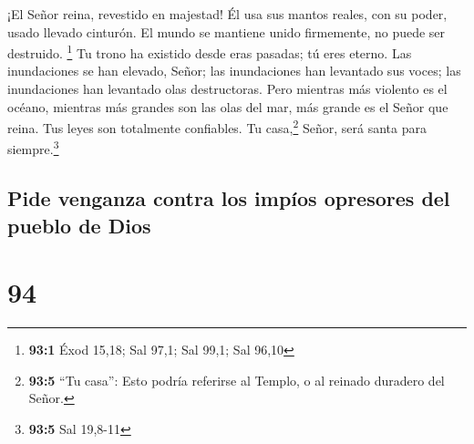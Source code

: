  ¡El Señor reina, revestido en majestad! Él usa sus mantos
reales, con su poder, usado llevado cinturón. El mundo se mantiene unido
firmemente, no puede ser destruido. \footnote{\textbf{93:1} Éxod 15,18;
  Sal 97,1; Sal 99,1; Sal 96,10}  Tu trono ha existido
desde eras pasadas; tú eres eterno.  Las inundaciones se
han elevado, Señor; las inundaciones han levantado sus voces; las
inundaciones han levantado olas destructoras.  Pero
mientras más violento es el océano, mientras más grandes son las olas
del mar, más grande es el Señor que reina.  Tus leyes son
totalmente confiables. Tu casa,\footnote{\textbf{93:5} ``Tu casa'': Esto
  podría referirse al Templo, o al reinado duradero del Señor.} Señor,
será santa para siempre.\footnote{\textbf{93:5} Sal 19,8-11}

\hypertarget{pide-venganza-contra-los-impuxedos-opresores-del-pueblo-de-dios}{%
\subsection{Pide venganza contra los impíos opresores del pueblo de
Dios}\label{pide-venganza-contra-los-impuxedos-opresores-del-pueblo-de-dios}}

\hypertarget{section-93}{%
\section{94}\label{section-93}}

